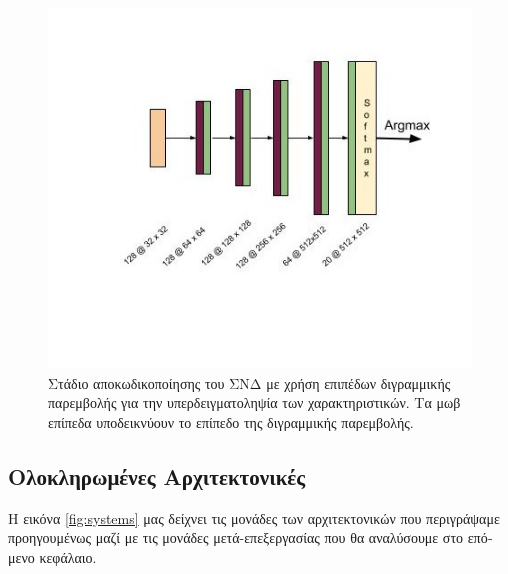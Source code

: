 \begin{figure}[H]
 \centering
 \includegraphics[scale=0.6]{Images/bilinear_conv}
  \caption[\textgreek{Διγραμμική Μονάδα Αποκωδικοποίησης}]{\textgreek{Στάδιο αποκωδικοποίησης του ΣΝΔ με χρήση επιπέδων διγραμμικής παρεμβολής για την υπερδειγματοληψία των χαρακτηριστικών. Τα μωβ επίπεδα υποδεικνύουν το επίπεδο της διγραμμικής παρεμβολής.}}
 \label{fig:bilinear_deconv}
\end{figure}
\pagebreak
\subsection{\textgreek{Ολοκληρωμένες Αρχιτεκτονικές}}
\textgreek{Η εικόνα }\ref{fig:systems} \textgreek{μας δείχνει τις μονάδες των αρχιτεκτονικών που περιγράψαμε προηγουμένως  μαζί με τις μονάδες μετά-επεξεργασίας που θα αναλύσουμε στο επόμενο κεφάλαιο. }

